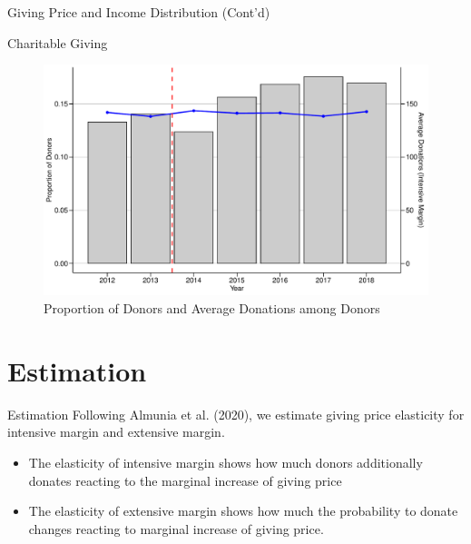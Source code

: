 \documentclass[
  ignorenonframetext,
]{beamer}
\providecommand{\tightlist}{%
  \setlength{\itemsep}{0pt}\setlength{\parskip}{0pt}}
\begin{document}
\begin{frame}{Giving Price and Income Distribution (Cont'd)}
\protect\hypertarget{giving-price-and-income-distribution-contd}{}
\end{frame}

\begin{frame}{Charitable Giving}
\protect\hypertarget{charitable-giving}{}
\begin{figure}[t]

{\centering \includegraphics[width=0.9\linewidth]{slides_files/figure-beamer/SummaryOutcome-1} 

}

\caption{Proportion of Donors and Average Donations among Donors}\label{fig:SummaryOutcome}
\end{figure}
\end{frame}

\hypertarget{estimation}{%
\section{Estimation}\label{estimation}}

\begin{frame}{Estimation}
Following Almunia et al. (2020), we estimate giving price elasticity for intensive margin and extensive margin.

\begin{itemize}
\tightlist
\item
  The elasticity of intensive margin shows how much donors additionally donates reacting to the marginal increase of giving price
\item
  The elasticity of extensive margin shows how much the probability to donate changes reacting to marginal increase of giving price.
\end{itemize}
\end{frame}
\end{document}
